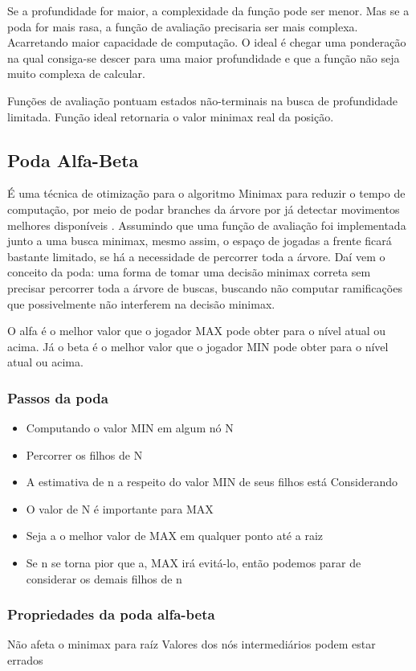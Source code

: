 \documentclass[sigplan,screen]{acmart}
\begin{document}
Se a profundidade for maior, a complexidade da função pode ser menor. Mas se a poda for mais rasa, a função de avaliação precisaria ser mais complexa. 
Acarretando maior capacidade de computação. 
O ideal é chegar uma ponderação na qual consiga-se descer para uma maior profundidade e que a função não seja muito complexa de calcular.

Funções de avaliação pontuam estados não-terminais na busca de profundidade limitada.
Função ideal retornaria o valor minimax real da posição.

\subsection{Poda Alfa-Beta}
É uma técnica de otimização para o algoritmo Minimax para reduzir o tempo de computação, por meio de podar branches da árvore por já detectar movimentos melhores disponíveis \cite{Aradhya04}.
Assumindo que uma função de avaliação foi implementada junto a uma busca minimax, mesmo assim, o espaço de jogadas a frente ficará bastante limitado, se há a necessidade de percorrer toda a árvore.
Daí vem o conceito da poda: uma forma de tomar uma decisão minimax correta sem precisar percorrer toda a árvore de buscas, buscando não computar ramificações que possivelmente não interferem na decisão minimax.

O alfa é o melhor valor que o jogador MAX pode obter para o nível atual ou acima. Já o beta é o melhor valor que o jogador MIN pode obter para o nível atual ou acima.

\subsubsection{Passos da poda}
\begin{itemize}
  \item Computando o valor MIN em algum nó N
  \item Percorrer os filhos de N
  \item A estimativa de n a respeito do valor MIN de seus filhos está Considerando
  \item O valor de N é importante para MAX
  \item Seja a o melhor valor de MAX em qualquer ponto até a raiz
  \item Se n se torna pior que a, MAX irá evitá-lo, então podemos parar de considerar os demais filhos de n
\end{itemize}

\subsubsection{Propriedades da poda alfa-beta}
Não afeta o minimax para raíz
Valores dos nós intermediários podem estar errados
\end{document}
